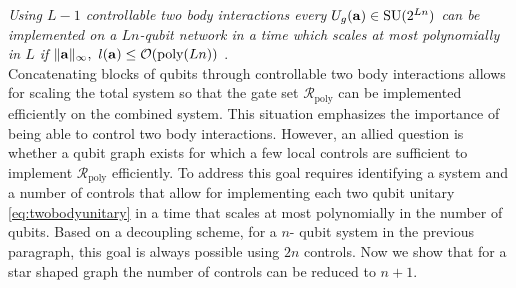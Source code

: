 \documentclass[aps,twocolumn,amsmath,amssymb,nofootinbib,superscriptaddress]{revtex4-1}
\begin{document}
\emph{
Using $L-1$ controllable two body interactions every $U_{g}(\bold{a})\in \text{SU}(2^{Ln})$ can be implemented on a $Ln$-qubit network in a time which scales at most polynomially in $L$ if $\Vert\bold{a}\Vert_{\infty},~l(\bold{a}) \leq \mathcal O(\text{poly}(Ln))$} . \\

 Concatenating blocks of qubits through controllable two body interactions allows for scaling the total system so that the gate set $\mathcal R_{\text{poly}}$ can be implemented efficiently on the combined system. This situation emphasizes the importance of being able to control two body interactions. However, an allied question is whether a qubit graph exists for which a few local controls are sufficient to implement $\mathcal R_{\text{poly}}$ efficiently. To address this goal requires identifying a system and a number of controls that allow for implementing each two qubit unitary \eqref{eq:twobodyunitary} in a time that scales at most polynomially in the number of qubits. Based on a decoupling scheme, for a $n$- qubit system in the previous paragraph, this goal is always possible using $2n$ controls. Now we show that for a star shaped graph the number of controls can be reduced to $n+1$.    
\end{document}
